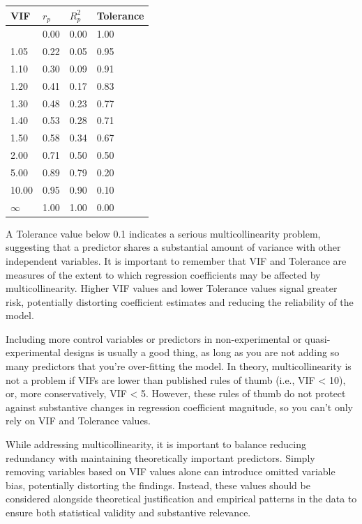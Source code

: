 \documentclass[
  letterpaper,
  DIV=11,
  numbers=noendperiod]{scrreprt}
\begin{document}
\begin{longtable}[]{@{}llll@{}}
\toprule\noalign{}
VIF & \(r_p\) & \(R^2_p\) & Tolerance \\
\midrule\noalign{}
\endhead
\bottomrule\noalign{}
\endlastfoot
1 & 0.00 & 0.00 & 1.00 \\
1.05 & 0.22 & 0.05 & 0.95 \\
1.10 & 0.30 & 0.09 & 0.91 \\
1.20 & 0.41 & 0.17 & 0.83 \\
1.30 & 0.48 & 0.23 & 0.77 \\
1.40 & 0.53 & 0.28 & 0.71 \\
1.50 & 0.58 & 0.34 & 0.67 \\
2.00 & 0.71 & 0.50 & 0.50 \\
5.00 & 0.89 & 0.79 & 0.20 \\
10.00 & 0.95 & 0.90 & 0.10 \\
\(\infty\) & 1.00 & 1.00 & 0.00 \\
\end{longtable}

A Tolerance value below 0.1 indicates a serious multicollinearity
problem, suggesting that a predictor shares a substantial amount of
variance with other independent variables. It is important to remember
that VIF and Tolerance are measures of the extent to which regression
coefficients may be affected by multicollinearity. Higher VIF values and
lower Tolerance values signal greater risk, potentially distorting
coefficient estimates and reducing the reliability of the model.\,

Including more control variables or predictors in non-experimental or
quasi-experimental designs is usually a good thing, as long as you are
not adding so many predictors that you're over-fitting the model. In
theory, multicollinearity is not a problem if VIFs are lower than
published rules of thumb (i.e., VIF \textless{} 10), or, more
conservatively, VIF \textless{} 5. However, these rules of thumb do not
protect against substantive changes in regression coefficient magnitude,
so you can't only rely on VIF and Tolerance values.\,\,

While addressing multicollinearity, it is important to balance reducing
redundancy with maintaining theoretically important predictors. Simply
removing variables based on VIF values alone can introduce omitted
variable bias, potentially distorting the findings. Instead, these
values should be considered alongside theoretical justification and
empirical patterns in the data to ensure both statistical validity and
substantive relevance.
\end{document}
